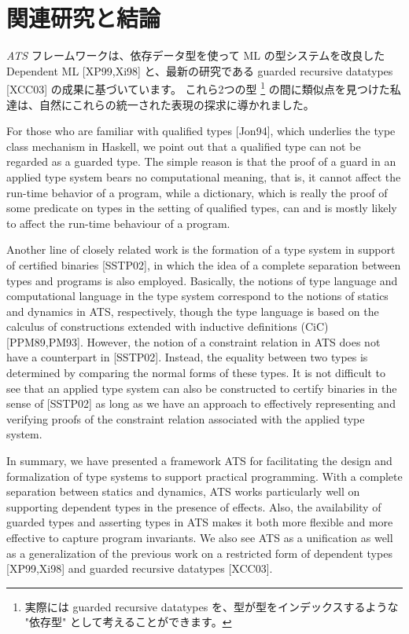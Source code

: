 \documentclass[submit,techreq,noauthor,onecolumn]{ipsj}
\begin{document}
\section{関連研究と結論}

{\it ATS} フレームワークは、依存データ型を使って ML の型システムを改良した Dependent ML [XP99,Xi98] と、最新の研究である guarded recursive datatypes [XCC03] の成果に基づいています。
これら2つの型
\footnote{実際には guarded recursive datatypes を、型が型をインデックスするような "依存型" として考えることができます。}
の間に類似点を見つけた私達は、自然にこれらの統一された表現の探求に導かれました。

For those who are familiar with qualified types [Jon94], which underlies the
type class mechanism in Haskell, we point out that a qualified type can not be
regarded as a guarded type.
The simple reason is that the proof of a guard in an
applied type system bears no computational meaning, that is, it cannot affect
the run-time behavior of a program, while a dictionary, which is really the proof
of some predicate on types in the setting of qualified types, can and is mostly
likely to affect the run-time behaviour of a program.

Another line of closely related work is the formation of a type system in
support of certified binaries [SSTP02], in which the idea of a complete separation
between types and programs is also employed.
Basically, the notions of type
language and computational language in the type system correspond to the
notions of statics and dynamics in ATS, respectively, though the type language
is based on the calculus of constructions extended with inductive definitions
(CiC) [PPM89,PM93].
However, the notion of a constraint relation in ATS does
not have a counterpart in [SSTP02].
Instead, the equality between two types is
determined by comparing the normal forms of these types.
It is not difficult to
see that an applied type system can also be constructed to certify binaries in
the sense of [SSTP02] as long as we have an approach to effectively representing
and verifying proofs of the constraint relation associated with the applied type
system.

In summary, we have presented a framework ATS for facilitating the design
and formalization of type systems to support practical programming.
With a complete separation between statics and dynamics, ATS works particularly well
on supporting dependent types in the presence of effects.
Also, the availability
of guarded types and asserting types in ATS makes it both more flexible and
more effective to capture program invariants.
We also see ATS as a unification
as well as a generalization of the previous work on a restricted form of dependent
types [XP99,Xi98] and guarded recursive datatypes [XCC03].
\end{document}
